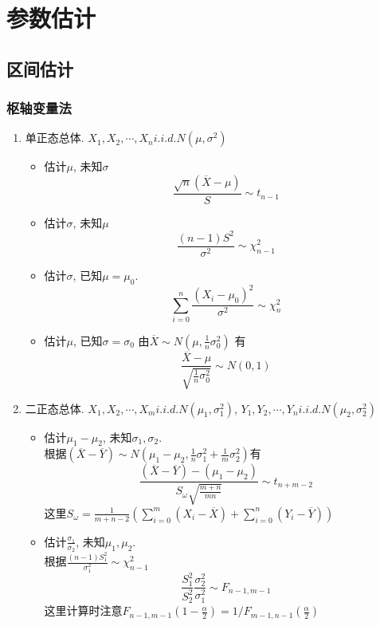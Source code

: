 \documentclass[UTF8]{article}
\begin{document}
\section{参数估计}
\subsection{区间估计}
\subsubsection{枢轴变量法}
\begin{enumerate}
	\item 单正态总体. $X_1, X_2, \cdots, X_n i.i.d. N(\mu, \sigma^2)$
	\begin{itemize}
		\item 估计$\mu$, 未知$\sigma$
		$$\frac{\sqrt{n}(\overline{X}-\mu)}{S}\sim t_{n-1}$$
		
		\item 估计$\sigma$, 未知$\mu$
		$$\frac{(n-1)S^2}{\sigma^2}\sim \chi_{n-1}^2$$
		
		\item 估计$\sigma$, 已知$\mu=\mu_0$.\\
		$$\sum\limits_{i=0}^n\frac{(X_i-\mu_0)^2}{\sigma^2} \sim \chi_{n}^2$$
		
		\item 估计$\mu$, 已知$\sigma=\sigma_0$
		由$\overline{X}\sim N(\mu,\frac{1}{n}\sigma_0^2)$
		有$$\frac{\overline{X}-\mu}{\sqrt{\frac{1}{n}\sigma_0^2}} \sim N(0, 1)$$
					
	\end{itemize}
	
	\item 二正态总体. $X_1, X_2, \cdots, X_m i.i.d. N(\mu_1, \sigma_1^2)$, $Y_1, Y_2, \cdots, Y_n i.i.d. N(\mu_2, \sigma_2^2)$
	\begin{itemize}
		\item 估计$\mu_1-\mu_2$, 未知$\sigma_1, \sigma_2$. \\
		根据$(\overline{X}-\overline{Y}) \sim N(\mu_1-\mu_2, \frac{1}{n}\sigma_1^2+\frac{1}{m}\sigma_2^2)$有
		$$\frac{(\overline{X}-\overline{Y})-(\mu_1-\mu_2)}{S_\omega\sqrt{\frac{m+n}{mn}}} \sim t_{n+m-2}$$
		这里$S_\omega=\frac{1}{m+n-2}(\sum\limits_{i=0}^{m}(X_i-\overline{X})+\sum\limits_{i=0}^{n}(Y_i-\overline{Y}))$
		
		\item 估计$\frac{\sigma_1}{\sigma_2}$, 未知$\mu_1, \mu_2$.\\
		根据$\frac{(n-1)S_1^2}{\sigma_1^2} \sim \chi_{n-1}^2$
		$$\frac{S_1^2}{S_2^2}\frac{\sigma_2^2}{\sigma_1^2} \sim F_{n-1, m-1}$$
		这里计算时注意$F_{n-1, m-1}(1-\frac{\alpha}{2})=1/F_{m-1, n-1}(\frac{\alpha}{2})$
		

\end{itemize}
\end{enumerate}
\end{document}
